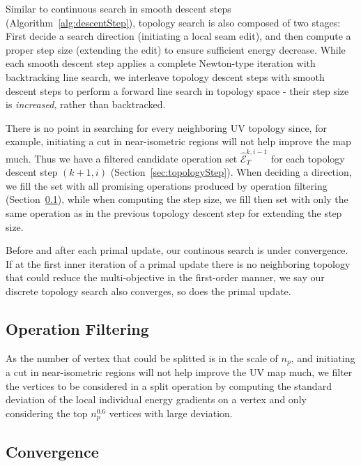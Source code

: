 Similar to continuous search in smooth descent steps (Algorithm~\ref{alg:descentStep}), topology search is also composed of two stages: First decide a search direction (initiating a local seam edit), and then compute a proper step size (extending the edit) to ensure sufficient energy decrease. While each smooth descent step applies a complete Newton-type iteration with backtracking line search, we interleave topology descent steps with smooth descent steps to perform a forward line search in topology space - their step size is \emph{increased}, rather than backtracked.

There is no point in searching for every neighboring UV topology since, for example, initiating a cut in near-isometric regions will not help improve the map much. Thus we have a filtered candidate operation set $\hat{\mathcal{E}}^{k,i-1}_T$ for each topology descent step $(k+1,i)$ (Section~\ref{sec:topologyStep}). When deciding a direction, we fill the set with all promising operations produced by operation filtering (Section~\ref{sec:operationFiltering}), while when computing the step size, we fill then set with only the same operation as in the previous topology descent step for extending the step size.

Before and after each primal update, our continous search is under convergence. If at the first inner iteration of a primal update there is no neighboring topology that could reduce the multi-objective in the first-order manner, we say our discrete topology search also converges, so does the primal update.





\subsection{Operation Filtering}
\label{sec:operationFiltering}
As the number of vertex that could be splitted is in the scale of $n_p$, and initiating a cut in near-isometric regions will not help improve the UV map much, we filter the vertices to be considered in a split operation by computing the standard deviation of the local individual energy gradients on a vertex and only considering the top $n_p^{0.6}$ vertices with large deviation. 

\subsection{Convergence}
\label{sec:convergence}

